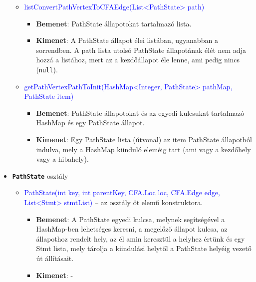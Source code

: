 \begin{itemize}
\begin{itemize}
		\item \textcolor{blue}{listConvertPathVertexToCFAEdge(List<PathState> path)}
		\begin{itemize}
			\item \textbf{Bemenet}: PathState állapotokat tartalmazó lista.
			\item \textbf{Kimenet}: A PathState állapot élei listában, ugyanabban a sorrendben. A path lista utolsó PathState állapotának élét nem adja hozzá a listához, mert az a kezdőállapot éle lenne, ami pedig nincs (\texttt{null}).
		\end{itemize}
	
		\item \textcolor{blue}{getPathVertexPathToInit(HashMap<Integer, PathState> pathMap, PathState item)}
		\begin{itemize}
			\item \textbf{Bemenet}: PathState állapotokat és az egyedi kulcsukat tartalmazó HashMap és egy PathState állapot.
			\item \textbf{Kimenet}: Egy PathState lista (útvonal) az item PathState állapotból indulva, mely a HashMap kiinduló eleméig tart (ami vagy a kezdőhely vagy a hibahely).
		\end{itemize}
	\end{itemize}

	\item \textbf{\texttt{PathState}} osztály
	\begin{itemize}
		\item \textcolor{blue}{PathState(int key, int parentKey, CFA.Loc loc, CFA.Edge edge, List<Stmt> stmtList)} -- az osztály öt elemű konstruktora.
		\begin{itemize}
			\item \textbf{Bemenet}: A PathState egyedi kulcsa, melynek segítségével a HashMap-ben lehetséges keresni, a megelőző állapot kulcsa, az állapothoz rendelt hely, az él amin keresztül a helyhez értünk és egy Stmt lista, mely tárolja a kiindulási helytől a PathState helyéig vezető út állításait. 
			\item \textbf{Kimenet}: -
		\end{itemize}
	\end{itemize}
\end{itemize}

